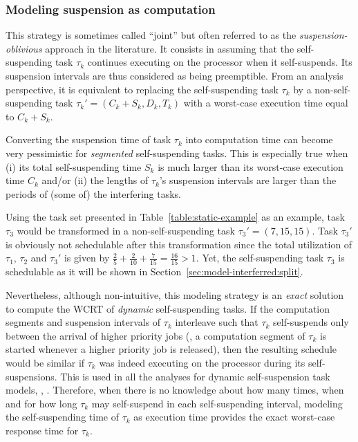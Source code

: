 \subsubsection{Modeling suspension as computation}
\label{sec:model-interferred-oblivious}

This strategy is sometimes called ``joint'' \cite{bletsas:thesis} but often referred to as the \emph{suspension-oblivious} approach in the literature. It consists in assuming that the self-suspending task $\tau_k$ continues executing on the processor when it self-suspends. Its suspension intervals are thus considered as being preemptible. From an analysis perspective, it is equivalent to replacing the self-suspending task $\tau_k$ by a non-self-suspending task $\tau_k' = (C_k + S_k, D_k, T_k)$ with a worst-case execution time equal to $C_k + S_k$. 

Converting the suspension time of task $\tau_k$ into computation time can become very pessimistic for \emph{segmented} self-suspending tasks. This is especially true when (i) its total self-suspending time $S_k$ is much larger than its worst-case execution time $C_k$ and/or (ii) the lengths of $\tau_k$'s suspension intervals are larger than the periods of (some of) the interfering tasks. 

\begin{example}
\label{ex:suspension-as-comput}   
Using the task set presented in Table~\ref{table:static-example} as an example, task $\tau_3$ would be transformed in a non-self-suspending task $\tau_3' = (7, 15, 15)$. Task $\tau_3'$ is obviously not schedulable after this transformation since the total utilization of $\tau_1$, $\tau_2$ and $\tau_3'$ is given by $\frac{2}{5} + \frac{2}{10} + \frac{7}{15} = \frac{16}{15} > 1$. Yet, the self-suspending task $\tau_3$ is schedulable as it will be shown in Section~\ref{sec:model-interferred:split}.
\hfill\myendproof  
\end{example}

Nevertheless, although non-intuitive, this modeling strategy is an \emph{exact} solution to compute the WCRT of \emph{dynamic} self-suspending tasks. If the computation segments and suspension intervals of $\tau_k$ interleave such that $\tau_k$ self-suspends only between the arrival of higher priority jobs
(\ie,  a computation segment of $\tau_k$ is started whenever a higher priority job is released), then the resulting schedule would be similar if $\tau_k$ was indeed executing on the processor during its self-suspensions. This is used in all the analyses for dynamic self-suspension task models, \eg, \cite{LiuChen:rtss2014,huangpass:dac2015,MingLiRTCSA1994,RTCSA-KimCPKH95,RTAS-AudsleyB04,ECRTS-AudsleyB04}.
Therefore, when there is no knowledge about how many times, when and for how long $\tau_k$ may self-suspend in each 
self-suspending interval, modeling the self-suspending time of $\tau_k$ as execution time provides the exact worst-case response 
time for $\tau_k$.


